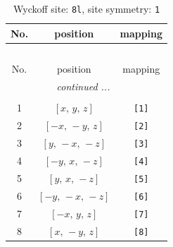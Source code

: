\documentclass[fleqn,8pt]{jsarticle}
\begin{document}
\renewcommand{\arraystretch}{1.2}
\begin{longtable}{ccc}
\caption{Wyckoff site: {\tt 8l}, site symmetry: {\tt 1}}
 \\
 \hline \hline
No. & position & mapping \\ \hline \endfirsthead

\multicolumn{2}{l}{\tablename\ \thetable{}} \\
 \hline \hline
No. & position & mapping \\ \hline \endhead

 \hline \hline
\multicolumn{2}{r}{\footnotesize\it continued ...} \\ \endfoot

 \hline \hline
\multicolumn{2}{r}{} \\ \endlastfoot

1 & $\left[ x,\, y,\, z \right]$ & {\tt [1]} \\ \hline
2 & $\left[ - x,\, - y,\, z \right]$ & {\tt [2]} \\ \hline
3 & $\left[ y,\, - x,\, - z \right]$ & {\tt [3]} \\ \hline
4 & $\left[ - y,\, x,\, - z \right]$ & {\tt [4]} \\ \hline
5 & $\left[ y,\, x,\, - z \right]$ & {\tt [5]} \\ \hline
6 & $\left[ - y,\, - x,\, - z \right]$ & {\tt [6]} \\ \hline
7 & $\left[ - x,\, y,\, z \right]$ & {\tt [7]} \\ \hline
8 & $\left[ x,\, - y,\, z \right]$ & {\tt [8]} \\
\end{longtable}
\end{document}
